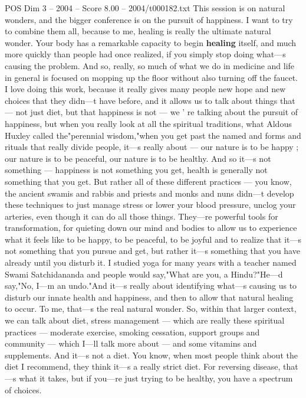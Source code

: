 \begin{textsample}{POS Dim 3 – 2004 – Score 8.00 – 2004/t000182.txt}  \label{ex:f3_pos_069}
This session is on natural wonders, and the bigger conference is on the pursuit of happiness.
I want to try to combine them all, because to me, healing is really the ultimate natural wonder.
Your body has a remarkable capacity to begin \textbf{healing} itself, and much more quickly than people had once realized, if you simply stop doing what—s causing the problem.
And so, really, so much of what we do in medicine and life in general is focused on mopping up the floor without also turning off the faucet.
I love doing this work, because it really gives many people new hope and new choices that they didn—t have before, and it allows us to talk about things that — not just diet, but that happiness is not — we ' re talking about the pursuit of happiness, but when you really look at all the spiritual traditions, what Aldous Huxley called the"perennial wisdom,"when you get past the named and forms and rituals that really divide people, it—s really about — our nature is to be happy ; our nature is to be peaceful, our nature is to be healthy.
And so it—s not something — happiness is not something you get, health is generally not something that you get.
But rather all of these different practices — you know, the ancient swamis and rabbis and priests and monks and nuns didn—t develop these techniques to just manage stress or lower your blood pressure, unclog your arteries, even though it can do all those things.
They—re powerful tools for transformation, for quieting down our mind and bodies to allow us to experience what it feels like to be happy, to be peaceful, to be joyful and to realize that it—s not something that you pursue and get, but rather it—s something that you have already until you disturb it.
I studied yoga for many years with a teacher named Swami Satchidananda and people would say,"What are you, a Hindu?"He—d say,"No, I—m an undo."And it—s really about identifying what—s causing us to disturb our innate health and happiness, and then to allow that natural healing to occur.
To me, that—s the real natural wonder.
So, within that larger context, we can talk about diet, stress management — which are really these spiritual practices — moderate exercise, smoking cessation, support groups and community — which I—ll talk more about — and some vitamins and supplements.
And it—s not a diet.
You know, when most people think about the diet I recommend, they think it—s a really strict diet.
For reversing disease, that—s what it takes, but if you—re just trying to be healthy, you have a spectrum of choices.

\end{textsample}
